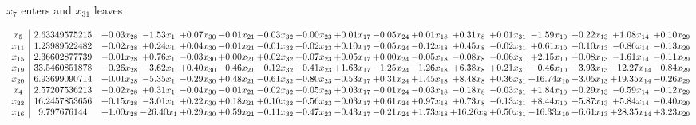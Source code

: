 \documentclass[9pt]{article}
\begin{document}
 $ x_{7} $ enters and $ x_{31} $ leaves 

 \[\begin{array}{c| c c@{\hskip 2pt} c@{\hskip 2pt} c@{\hskip 2pt} c@{\hskip 2pt} c@{\hskip 2pt} c@{\hskip 2pt} c@{\hskip 2pt} c@{\hskip 2pt} c@{\hskip 2pt} c@{\hskip 2pt} c@{\hskip 2pt} c@{\hskip 2pt} c@{\hskip 2pt} c@{\hskip 2pt} c@{\hskip 2pt} }
 x_{5}   &  2.63349575215 & +  0.03 x_{28} & -1.53 x_{1} & +  0.07 x_{30} & -0.01 x_{21} & -0.03 x_{32} & -0.00 x_{23} & +  0.01 x_{17} & -0.05 x_{24} & +  0.01 x_{18} & +  0.31 x_{8} & +  0.01 x_{31} & -1.59 x_{10} & -0.22 x_{13} & +  1.08 x_{14} & +  0.10 x_{29}\\
 x_{11}   &  1.23989522482 & -0.02 x_{28} & +  0.24 x_{1} & +  0.04 x_{30} & -0.01 x_{21} & -0.01 x_{32} & +  0.02 x_{23} & +  0.10 x_{17} & -0.05 x_{24} & -0.12 x_{18} & +  0.45 x_{8} & -0.02 x_{31} & +  0.61 x_{10} & -0.10 x_{13} & -0.86 x_{14} & -0.13 x_{29}\\
 x_{15}   &  2.36602877739 & -0.01 x_{28} & +  0.76 x_{1} & -0.03 x_{30} & +  0.00 x_{21} & +  0.02 x_{32} & +  0.07 x_{23} & +  0.05 x_{17} & +  0.00 x_{24} & -0.05 x_{18} & -0.08 x_{8} & -0.06 x_{31} & +  2.15 x_{10} & -0.08 x_{13} & -1.61 x_{14} & -0.11 x_{29}\\
 x_{19}   &  33.5460851878 & -0.26 x_{28} & -3.62 x_{1} & +  0.40 x_{30} & -0.46 x_{21} & -0.12 x_{32} & +  0.41 x_{23} & +  1.63 x_{17} & -1.25 x_{24} & -1.26 x_{18} & +  6.38 x_{8} & +  0.21 x_{31} & -0.46 x_{10} & -3.93 x_{13} & -12.27 x_{14} & -0.84 x_{29}\\
 x_{20}   &  6.93699090714 & +  0.01 x_{28} & -5.35 x_{1} & -0.29 x_{30} & +  0.48 x_{21} & -0.61 x_{32} & -0.80 x_{23} & -0.53 x_{17} & +  0.31 x_{24} & +  1.45 x_{18} & +  8.48 x_{8} & +  0.36 x_{31} & + 16.74 x_{10} & -3.05 x_{13} & + 19.35 x_{14} & -0.26 x_{29}\\
 x_{4}   &  2.57207536213 & -0.02 x_{28} & +  0.31 x_{1} & -0.04 x_{30} & -0.01 x_{21} & -0.02 x_{32} & +  0.05 x_{23} & +  0.03 x_{17} & -0.01 x_{24} & -0.03 x_{18} & -0.18 x_{8} & -0.03 x_{31} & +  1.84 x_{10} & -0.29 x_{13} & -0.59 x_{14} & -0.12 x_{29}\\
 x_{22}   &  16.2457853656 & +  0.15 x_{28} & -3.01 x_{1} & +  0.22 x_{30} & +  0.18 x_{21} & +  0.10 x_{32} & -0.56 x_{23} & -0.03 x_{17} & +  0.61 x_{24} & +  0.97 x_{18} & +  0.73 x_{8} & -0.13 x_{31} & +  8.44 x_{10} & -5.87 x_{13} & +  5.84 x_{14} & -0.40 x_{29}\\
 x_{16}   &  9.797676144 & +  1.00 x_{28} & -26.40 x_{1} & +  0.29 x_{30} & +  0.59 x_{21} & -0.11 x_{32} & -0.47 x_{23} & -0.43 x_{17} & -0.21 x_{24} & +  1.73 x_{18} & + 16.26 x_{8} & +  0.50 x_{31} & -16.33 x_{10} & +  6.61 x_{13} & + 28.35 x_{14} & +  3.23 x_{29}\\

\end{array}\]
\end{document}
